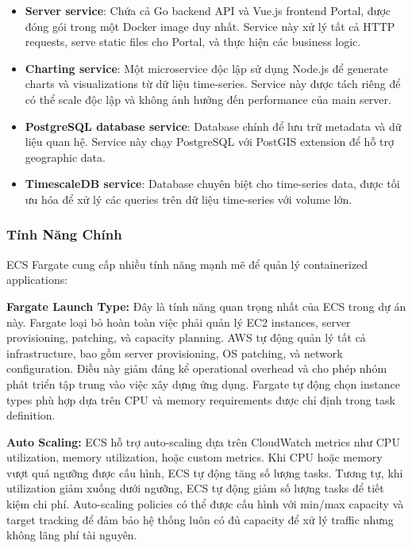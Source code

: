 \begin{itemize}
    \item \textbf{Server service}: Chứa cả Go backend API và Vue.js frontend Portal, được đóng gói trong một Docker image duy nhất. Service này xử lý tất cả HTTP requests, serve static files cho Portal, và thực hiện các business logic.
    
    \item \textbf{Charting service}: Một microservice độc lập sử dụng Node.js để generate charts và visualizations từ dữ liệu time-series. Service này được tách riêng để có thể scale độc lập và không ảnh hưởng đến performance của main server.
    
    \item \textbf{PostgreSQL database service}: Database chính để lưu trữ metadata và dữ liệu quan hệ. Service này chạy PostgreSQL với PostGIS extension để hỗ trợ geographic data.
    
    \item \textbf{TimescaleDB service}: Database chuyên biệt cho time-series data, được tối ưu hóa để xử lý các queries trên dữ liệu time-series với volume lớn.
\end{itemize}

\subsubsection{Tính Năng Chính}

ECS Fargate cung cấp nhiều tính năng mạnh mẽ để quản lý containerized applications:

\textbf{Fargate Launch Type:} Đây là tính năng quan trọng nhất của ECS trong dự án này. Fargate loại bỏ hoàn toàn việc phải quản lý EC2 instances, server provisioning, patching, và capacity planning. AWS tự động quản lý tất cả infrastructure, bao gồm server provisioning, OS patching, và network configuration. Điều này giảm đáng kể operational overhead và cho phép nhóm phát triển tập trung vào việc xây dựng ứng dụng. Fargate tự động chọn instance types phù hợp dựa trên CPU và memory requirements được chỉ định trong task definition.

\textbf{Auto Scaling:} ECS hỗ trợ auto-scaling dựa trên CloudWatch metrics như CPU utilization, memory utilization, hoặc custom metrics. Khi CPU hoặc memory vượt quá ngưỡng được cấu hình, ECS tự động tăng số lượng tasks. Tương tự, khi utilization giảm xuống dưới ngưỡng, ECS tự động giảm số lượng tasks để tiết kiệm chi phí. Auto-scaling policies có thể được cấu hình với min/max capacity và target tracking để đảm bảo hệ thống luôn có đủ capacity để xử lý traffic nhưng không lãng phí tài nguyên.

